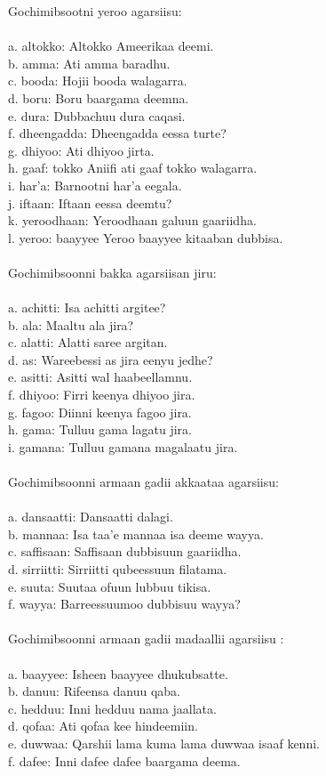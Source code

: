 \documentclass[11pt,b5paper]{book}
\begin{document}
Gochimibsootni yeroo agarsiisu:\\
\\
a. altokko: Altokko Ameerikaa deemi.\\
b. amma: Ati amma baradhu.\\
c. booda: Hojii booda walagarra.\\
d. boru: Boru baargama deemna.\\
e. dura: Dubbachuu dura caqasi.\\
f. dheengadda: Dheengadda eessa turte?\\
g. dhiyoo: Ati dhiyoo jirta.\\
h. gaaf: tokko Aniifi ati gaaf tokko walagarra.\\
i. har’a: Barnootni har’a eegala.\\
j. iftaan: Iftaan eessa deemtu?\\
k. yeroodhaan: Yeroodhaan galuun gaariidha.\\
l. yeroo: baayyee Yeroo baayyee kitaaban dubbisa.\\
\\
Gochimibsoonni bakka agarsiisan jiru:\\
\\
a. achitti: Isa achitti argitee?\\
b. ala: Maaltu ala jira?\\
c. alatti: Alatti saree argitan.\\
d. as: Wareebessi as jira eenyu jedhe?\\
e. asitti: Asitti wal haabeellamnu.\\
f. dhiyoo: Firri keenya dhiyoo jira.\\
g. fagoo: Diinni keenya fagoo jira.\\
h. gama: Tulluu gama lagatu jira.\\
i. gamana: Tulluu gamana magalaatu jira.\\
\\
Gochimibsoonni armaan gadii akkaataa agarsiisu:\\
\\
a. dansaatti: Dansaatti dalagi.\\
b. mannaa: Isa taa’e mannaa isa deeme wayya.\\
c. saffisaan: Saffisaan dubbisuun gaariidha.\\
d. sirriitti: Sirriitti qubeessuun filatama.\\
e. suuta: Suutaa ofuun lubbuu tikisa.\\
f. wayya: Barreessuumoo dubbisuu wayya?\\
\\
Gochimibsoonni armaan gadii madaallii agarsiisu \cite[pp.97-98]{griefenow2001grammatical}:\\
\\
a. baayyee: Isheen baayyee dhukubsatte.\\
b. danuu: Rifeensa danuu qaba.\\
c. hedduu: Inni hedduu nama jaallata.\\
d. qofaa: Ati qofaa kee hindeemiin.\\
e. duwwaa: Qarshii lama kuma lama duwwaa isaaf kenni.\\
f. dafee: Inni dafee dafee baargama deema.\\
\end{document}
